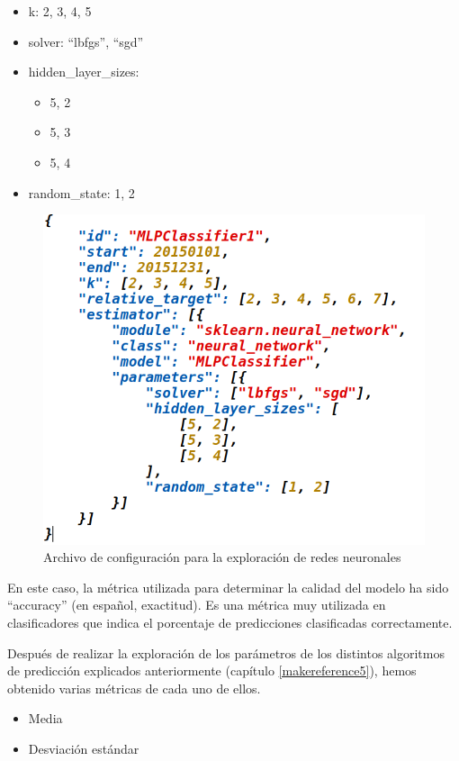 \begin{itemize}
\item k: 2, 3, 4, 5
\item solver: ``lbfgs'', ``sgd''
\item hidden\_layer\_sizes:
	\begin{itemize}
	\item 5, 2
	\item 5, 3
	\item 5, 4
	\end{itemize}
\item random\_state: 1, 2
\end{itemize}

\begin{figure}[htb]
	\begin{center}
		\includegraphics[width=12cm]{figures/json_mlp.png}
		\caption{Archivo de configuración para la exploración de redes neuronales \label{json_mlp}}
	\end{center}
\end{figure}

En este caso, la métrica utilizada para determinar la calidad del modelo ha sido ``accuracy'' (en español, exactitud). Es una métrica muy utilizada en clasificadores que indica el porcentaje de predicciones clasificadas correctamente.

Después de realizar la exploración de los parámetros de los distintos algoritmos de predicción explicados anteriormente (capítulo \ref{makereference5}), hemos obtenido varias métricas de cada uno de ellos.

\begin{itemize}
	\item Media
	\item Desviación estándar
\end{itemize}

